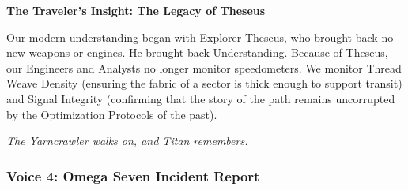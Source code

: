 \documentclass[11pt]{article}
\begin{document}
\begin{archivebox}
\textbf{The Traveler's Insight: The Legacy of Theseus}

Our modern understanding began with Explorer Theseus, who brought back no new weapons or engines. He brought back Understanding. Because of Theseus, our Engineers and Analysts no longer monitor speedometers. We monitor Thread Weave Density (ensuring the fabric of a sector is thick enough to support transit) and Signal Integrity (confirming that the story of the path remains uncorrupted by the Optimization Protocols of the past).

\textit{The Yarncrawler walks on, and Titan remembers.}
\end{archivebox}

\subsubsection{Voice 4: Omega Seven Incident Report}
\end{document}
